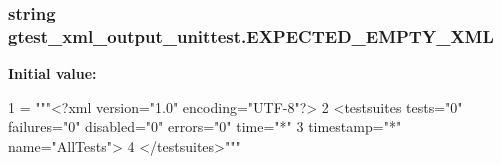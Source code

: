 \subsubsection[{\texorpdfstring{E\+X\+P\+E\+C\+T\+E\+D\+\_\+\+E\+M\+P\+T\+Y\+\_\+\+X\+ML}{EXPECTED_EMPTY_XML}}]{\setlength{\rightskip}{0pt plus 5cm}string gtest\+\_\+xml\+\_\+output\+\_\+unittest.\+E\+X\+P\+E\+C\+T\+E\+D\+\_\+\+E\+M\+P\+T\+Y\+\_\+\+X\+ML}\hypertarget{namespacegtest__xml__output__unittest_abe1569d019b037f006986004349c7cf3}{}\label{namespacegtest__xml__output__unittest_abe1569d019b037f006986004349c7cf3}
{\bfseries Initial value\+:}
\begin{DoxyCode}
1 = \textcolor{stringliteral}{"""<?xml version="1.0" encoding="UTF-8"?>}
2 \textcolor{stringliteral}{<testsuites tests="0" failures="0" disabled="0" errors="0" time="*"}
3 \textcolor{stringliteral}{            timestamp="*" name="AllTests">}
4 \textcolor{stringliteral}{</testsuites>"""}
\end{DoxyCode}
